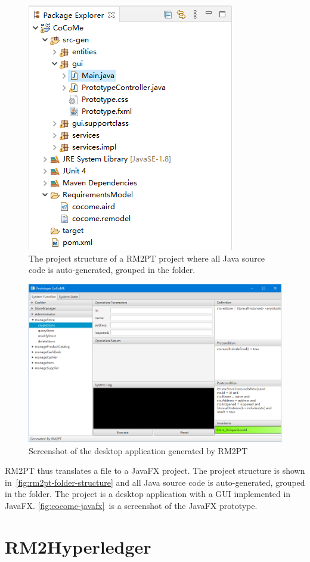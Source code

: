 \begin{figure}[ht]
\centering
\includegraphics[width=0.5\linewidth]{rm2pt-folder-structure}
\caption{The project structure of a RM2PT project where all Java source code is auto-generated, grouped in the  folder.}
\label{fig:rm2pt-folder-structure}
\end{figure}

\begin{figure}
\centering
\includegraphics[width=0.7\linewidth]{cocome-javafx}
\caption{Screenshot of the desktop application generated by RM2PT}
\label{fig:cocome-javafx}
\end{figure}


RM2PT thus translates a  file to a JavaFX project. The project structure is shown in~\autoref{fig:rm2pt-folder-structure} and all Java source code is auto-generated, grouped in the  folder.
The project is a desktop application with a GUI implemented in JavaFX. \autoref{fig:cocome-javafx}~is a screenshot of the JavaFX prototype.


\section{RM2Hyperledger}

